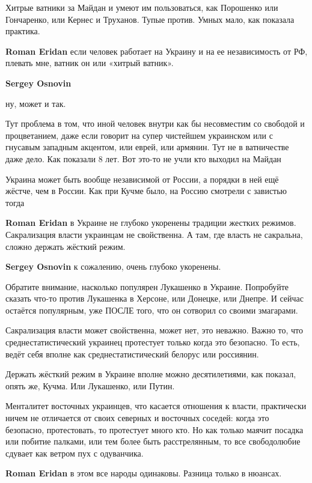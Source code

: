 \begin{itemize}
\begin{itemize}

Хитрые ватники за Майдан и умеют им пользоваться, как Порошенко или Гончаренко,
или Кернес и Труханов. Тупые против. Умных мало, как показала практика.


\textbf{Roman Eridan} если человек работает на Украину и на ее независимость от РФ, плевать мне, ватник он или «хитрый ватник».

\textbf{Sergey Osnovin} 

ну, может и так.

Тут проблема в том, что иной человек внутри как бы несовместим со свободой и
процветанием, даже если говорит на супер чистейшем украинском или с гнусавым
западным акцентом, или еврей, или армянин. Тут не в ватничестве даже дело. Как
показали 8 лет. Вот это-то не учли кто выходил на Майдан

Украина может быть вообще независимой от России, а порядки в ней ещё жёстче,
чем в России. Как при Кучме было, на Россию смотрели с завистью тогда

\textbf{Roman Eridan} в Украине не глубоко укоренены традиции жестких режимов. Сакрализация власти украинцам не свойственна. А там, где власть не сакральна, сложно держать жёсткий режим.

\textbf{Sergey Osnovin} к сожалению, очень глубоко укоренены.

Обратите внимание, насколько популярен Лукашенко в Украине. Попробуйте сказать
что-то против Лукашенка в Херсоне, или Донецке, или Днепре. И сейчас остаётся
популярным, уже ПОСЛЕ того, что он сотворил со своими змагарами.

Сакрализация власти может свойственна, может нет, это неважно. Важно то, что
среднестатистический украинец протестует только когда это безопасно. То есть,
ведёт себя вполне как среднестатистический белорус или россиянин.

Держать жёсткий режим в Украине вполне можно десятилетиями, как показал, опять
же, Кучма. Или Лукашенко, или Путин.

Менталитет восточных украинцев, что касается отношения к власти, практически
ничем не отличается от своих северных и восточных соседей: когда это безопасно,
протестовать, то протестует много кто. Но как только маячит посадка или побитие
палками, или тем более быть расстрелянным, то все свободолюбие сдувает как
ветром пух с одуванчика.

\textbf{Roman Eridan} в этом все народы одинаковы. Разница только в нюансах.


\end{itemize}
\end{itemize}
